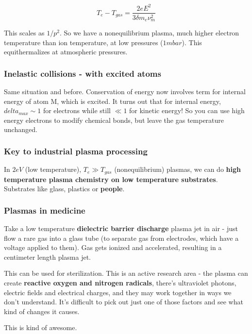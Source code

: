 \documentclass[PlasmaNotes.tex]{subfiles}
\begin{document}
\[T_e - T_{gas} = \frac{2 e E^2}{3 \delta m_e \nu_m^2}\]

This scales as $1/p^2$. So we have a nonequilibrium plasma, much higher electron temperature than ion temperature, at low pressures ($1 mbar$). This equithermalizes at atmospheric pressures.

\subsubsection{Inelastic collisions - with excited atoms}

Same situation and before. Conservation of energy now involves term for internal energy of atom M, which is excited. It turns out that for internal energy, $delta_{max} \sim 1$ for electrons while still $\ll 1$ for kinetic energy! So you can use high energy electrons to modify chemical bonds, but leave the gas temperature unchanged.

\subsubsection{Key to industrial plasma  processing}

In $2 eV$ (low temperature), $T_e \gg T_{gas}$ (nonequilibrium) plasmas, we can do \textbf{high temperature plasma chemistry on low temperature substrates}. Substrates like glass, plastics or \textbf{people}.

\subsubsection{Plasmas in medicine}

Take a low temperature \textbf{dielectric barrier discharge} plasma jet in air - just flow a rare gas into a glass tube (to separate gas from electrodes, which have a voltage applied to them). Gas gets ionized and accelerated, resulting in a centimeter length plasma jet.

This can be used for sterilization. This is an active research area - the plasma can create \textbf{reactive oxygen and nitrogen radicals}, there's ultraviolet photons, electric fields and electrical charges, and they may work together in ways we don't understand. It's difficult to pick out just one of those factors and see what kind of changes it causes.

This is kind of awesome.
\end{document}
